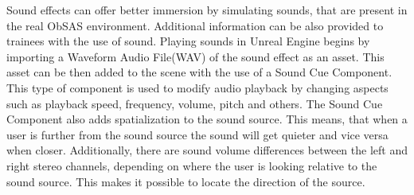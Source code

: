 \documentclass[12pt, a4paper,oneside, nocenter]{thesis}
\begin{document}
Sound effects can offer better immersion by simulating sounds, that are present in the real ObSAS environment. Additional information can be also provided to trainees with the use of sound. Playing sounds in Unreal Engine begins by importing a Waveform Audio File(WAV) of the sound effect as an asset. This asset can be then added to the scene with the use of a Sound Cue Component. This type of component is used to modify audio playback by changing aspects such as playback speed, frequency, volume, pitch and others. The Sound Cue Component also adds spatialization to the sound source. This means, that when a user is further from the sound source the sound will get quieter and vice versa when closer. Additionally, there are sound volume differences between the left and right stereo channels, depending on where the user is looking relative to the sound source. This makes it possible to locate the direction of the source.
\end{document}
